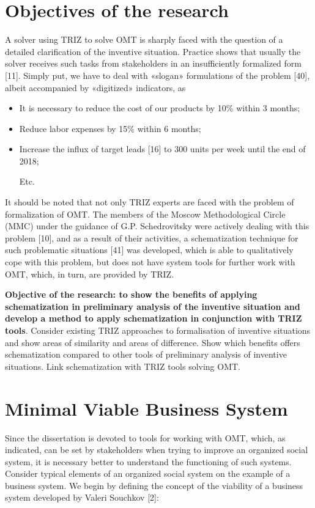 \documentclass[11pt,a4paper]{book}
\begin{document}
\section{Objectives of the research}
A solver using TRIZ to solve OMT is sharply faced with the question of a
detailed clarification of the inventive situation.  Practice shows that
usually the solver receives such tasks from stakeholders in an insufficiently
formalized form [11]. Simply put, we have to deal with «slogan» formulations
of the problem [40], albeit accompanied by «digitized» indicators, as
\begin{itemize}[noitemsep]
\item It is necessary to reduce the cost of our products by 10\% within 3
  months;
\item Reduce labor expenses by 15\% within 6 months;
\item Increase the influx of target leads [16] to 300 units per week until
  the end of 2018;
  
  Etc.
\end{itemize}
It should be noted that not only TRIZ experts are faced with the problem of
formalization of OMT. The members of the Moscow Methodological Circle (MMC)
under the guidance of G.P. Schedrovitsky were actively dealing with this
problem [10], and as a result of their activities, a schematization technique
for such problematic situations [41] was developed, which is able to
qualitatively cope with this problem, but does not have system tools for
further work with OMT, which, in turn, are provided by TRIZ.

\textbf{Objective of the research: to show the benefits of applying
  schematization in preliminary analysis of the inventive situation and
  develop a method to apply schematization in conjunction with TRIZ tools}.
Consider existing TRIZ approaches to formalisation of inventive situations and
show areas of similarity and areas of difference. Show which benefits offers
schematization compared to other tools of preliminary analysis of inventive
situations. Link schematization with TRIZ tools solving OMT.

\section{Minimal Viable Business System}
Since the dissertation is devoted to tools for working with OMT, which, as
indicated, can be set by stakeholders when trying to improve an organized
social system, it is necessary better to understand the functioning of such
systems. Consider typical elements of an organized social system on the
example of a business system.  We begin by defining the concept of the
viability of a business system developed by Valeri Souchkov [2]:
\end{document}
